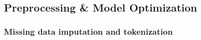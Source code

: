 \documentclass[pmlr]{jmlr}%
\begin{document}




\subsection{Preprocessing \& Model Optimization}
\subsubsection{{Missing data imputation and tokenization}} %
\end{document}

